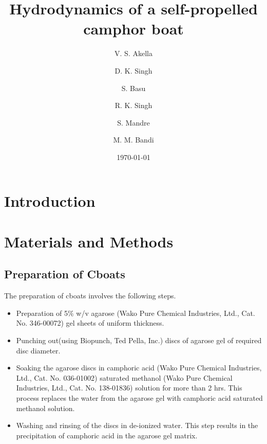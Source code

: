 \documentclass[aps,twocolumn, floatfix, superscriptaddress]{revtex4}
\begin{document}
\title{Hydrodynamics of a self-propelled camphor boat}

\author{V. S. Akella}
\author{D. K. Singh}
\author{S. Basu}
\author{R. K. Singh}
\author{S. Mandre}
\author{M. M. Bandi}

\date{\today}

\begin{abstract}
\end{abstract}


\maketitle
\section{Introduction}
\section{Materials and Methods}
\subsection{Preparation of Cboats}
\label{sec:prep}
The preparation of cboats involves the following steps.
\begin{itemize}
\item Preparation of 5\% w/v agarose (Wako Pure Chemical Industries, Ltd., Cat. No. 346-00072) gel sheets of uniform thickness.
\item Punching out(using Biopunch, Ted Pella, Inc.) discs of agarose gel of required disc diameter. 
\item Soaking the agarose discs in camphoric acid (Wako Pure Chemical Industries, Ltd., Cat. No. 036-01002) saturated methanol (Wako Pure Chemical Industries, Ltd., Cat. No. 138-01836) solution for more than 2 hrs. This process replaces the water from the agarose gel with camphoric acid saturated methanol solution. 
\item Washing and rinsing of the discs in de-ionized water. This step results in the precipitation of camphoric acid in the agarose gel matrix.
\end{itemize}
\end{document}
